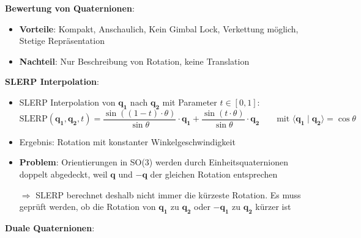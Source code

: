 \textbf{Bewertung von Quaternionen}:
\begin{itemize}
	\item \textbf{Vorteile}: Kompakt, Anschaulich, Kein Gimbal Lock, Verkettung möglich, Stetige Repräsentation
	\item \textbf{Nachteil}: Nur Beschreibung von Rotation, keine Translation
\end{itemize}
\pagebreak
\textbf{SLERP Interpolation}:
\begin{itemize}
	\item SLERP Interpolation von $\mathbf{q_1}$ nach $\mathbf{q_2}$ mit Parameter $t\in[0,1]$:	
	$$\text{SLERP}(\mathbf{q_1},\mathbf{q_2},t)=\frac{\sin((1-t)\cdot\theta)}{\sin\theta}\cdot\mathbf{q_1}+\frac{\sin(t\cdot\theta)}{\sin\theta}\cdot\mathbf{q_2}\qquad \text{mit }\langle\mathbf{q_1}\mid\mathbf{q_2}\rangle=\cos\theta$$
	\item Ergebnis: Rotation mit konstanter Winkelgeschwindigkeit
	\item \textbf{Problem}: Orientierungen in SO(3) werden durch Einheitsquaternionen doppelt abgedeckt, weil $\mathbf{q}$ und $-\mathbf{q}$ der gleichen Rotation entsprechen
	
	$\Rightarrow$ SLERP berechnet deshalb nicht immer die kürzeste Rotation. Es muss geprüft werden, ob die Rotation von $\mathbf{q_1}$ zu $\mathbf{q_2}$ oder $-\mathbf{q_1}$ zu $\mathbf{q_2}$ kürzer ist
\end{itemize}
\bigskip
\textbf{Duale Quaternionen}:
